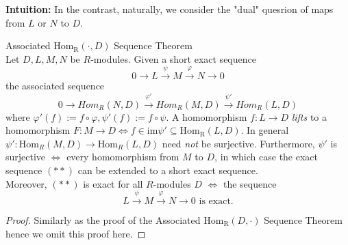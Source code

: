 \noindent\textbf{Intuition:} In the contrast, naturally, we consider the "dual" quesrion of maps from $L$ or $N$ to $D$.

\begin{theorem}{Associated $\text{Hom}_\text{R} (\cdot,D)$ Sequence Theorem}\\
Let $D,L,M,N$ be $R$-modules. Given a short exact sequence
$$0 \to L \overset{\psi}{\to} M \overset{\varphi}{\to} N \to 0$$
the associated sequence
\begin{equation*}
    0 \to Hom_R (N,D) \overset{\varphi'}{\to} Hom_R(M,D) \overset{\psi'}{\to} Hom_R(L,D)  \tag{**}
\end{equation*}
where $\varphi' (f) := f\circ \varphi, \psi' (f) := f\circ \psi$. A homomorphism $f: L\to D$ \textit{lifts} to a homomorphism $F: M\to D \Leftrightarrow f\in \text{im} \psi' \subseteq \text{Hom}_\text{R} (L,D)$. In general $\psi': \text{Hom}_{R} (M,D) \to \text{Hom}_{R} (L,D)$ need \textit{not} be surjective. Furthermore, $\psi'$ is surjective $\Leftrightarrow$ every homomorphism from $M$ to $D$, in which case the exact sequence $(**)$ can be extended to a short exact sequence.\\
Moreover, $(**)$ is exact for all $R$-modules $D$ $\Leftrightarrow$ the sequence
\[
L \overset{\psi}{\to} M \overset{\varphi}{\to} N \to 0 \text{ is exact.}
\]
\end{theorem}

\begin{proof}
    Similarly as the proof of the Associated $\text{Hom}_\text{R} (D,\cdot)$ Sequence Theorem hence we omit this proof here.
\end{proof}

